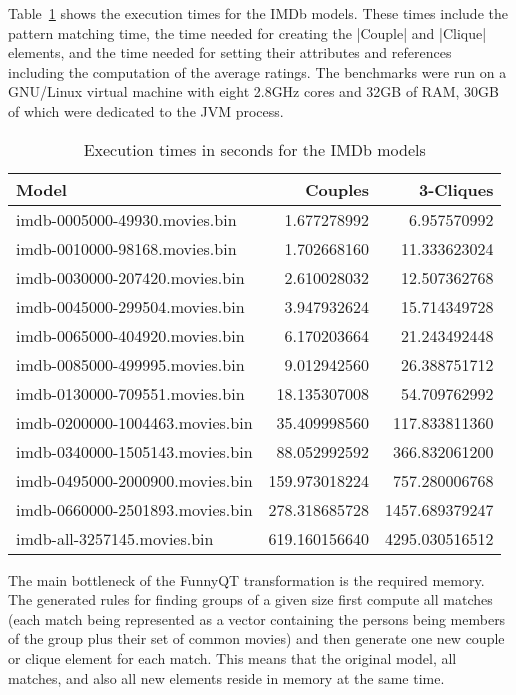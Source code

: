 \documentclass[submission]{eptcs}
\newcommand{\code}{\clojureinline}
\begin{document}
Table~\ref{tab:bench-imdb} shows the execution times for the IMDb models.
These times include the pattern matching time, the time needed for creating the
\code|Couple| and \code|Clique| elements, and the time needed for setting their
attributes and references including the computation of the average ratings.
The benchmarks were run on a GNU/Linux virtual machine with eight 2.8GHz cores
and 32GB of RAM, 30GB of which were dedicated to the JVM process.

\begin{table}[h!tb]
  \footnotesize
  \centering
  \begin{tabular}{| l | r | r |}
    \hline
    \textbf{Model}                  & \textbf{Couples} & \textbf{3-Cliques}\\
    \hline
    imdb-0005000-49930.movies.bin   &   1.677278992    &        6.957570992\\
    imdb-0010000-98168.movies.bin   &   1.702668160    &        11.333623024\\
    imdb-0030000-207420.movies.bin  &   2.610028032    &        12.507362768\\
    imdb-0045000-299504.movies.bin  &   3.947932624    &        15.714349728\\
    imdb-0065000-404920.movies.bin  &   6.170203664    &        21.243492448\\
    imdb-0085000-499995.movies.bin  &   9.012942560    &        26.388751712\\
    imdb-0130000-709551.movies.bin  &   18.135307008   &        54.709762992\\
    imdb-0200000-1004463.movies.bin &   35.409998560   &        117.833811360\\
    imdb-0340000-1505143.movies.bin &   88.052992592   &        366.832061200\\
    imdb-0495000-2000900.movies.bin &   159.973018224  &        757.280006768\\
    imdb-0660000-2501893.movies.bin &   278.318685728  &        1457.689379247\\
    imdb-all-3257145.movies.bin     &   619.160156640  &        4295.030516512\\
    \hline
  \end{tabular}
  \caption{Execution times in seconds for the IMDb models}
  \label{tab:bench-imdb}
\end{table}

The main bottleneck of the FunnyQT transformation is the required memory.  The
generated rules for finding groups of a given size first compute all matches
(each match being represented as a vector containing the persons being members
of the group plus their set of common movies) and then generate one new couple
or clique element for each match.  This means that the original model, all
matches, and also all new elements reside in memory at the same time.
\end{document}
